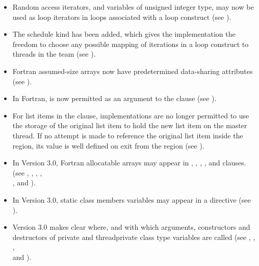 \begin{itemize}
\item Random access iterators, and variables of unsigned integer type, may now be used as 
loop iterators in loops associated with a loop construct (see 
). 

\item The schedule kind  has been added, which gives the implementation the 
freedom to choose any possible mapping of iterations in a loop construct to threads in 
the team (see ).

\item Fortran assumed-size arrays now have predetermined data-sharing attributes (see 
).

\item In Fortran,  is now permitted as an argument to the  
clause (see 
).

\item For list items in the  clause, implementations are no longer permitted to use 
the storage of the original list item to hold the new list item on the master thread. If 
no attempt is made to reference the original list item inside the  region, its 
value is well defined on exit from the  region (see 
).

\item In Version 3.0, Fortran allocatable arrays may appear in , 
, , ,  and  
clauses. (see 
, 
, 
, 
,\\
, 
 and 
). 

\item In Version 3.0, static class members variables may appear in a  
directive (see 
). 

\item Version 3.0 makes clear where, and with which arguments, constructors and 
destructors of private and threadprivate class type variables are called (see 
, 
, 
,\\
 and 
).


\end{itemize}
